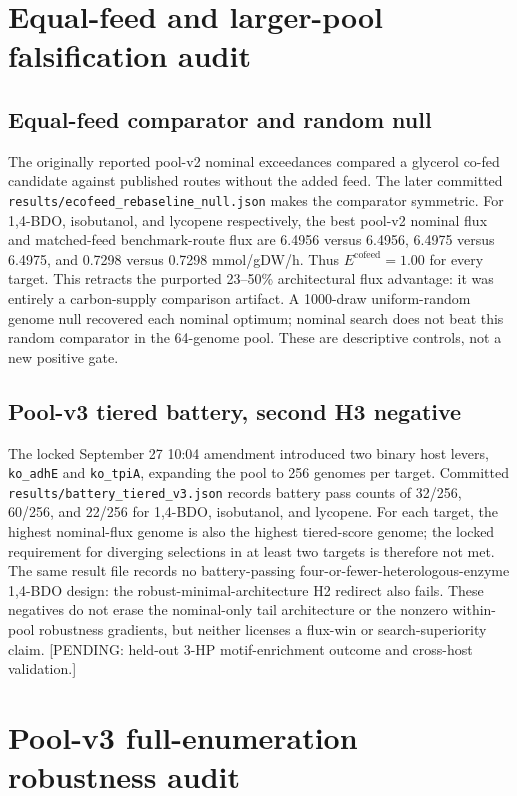 \section{Equal-feed and larger-pool falsification audit}
\subsection{Equal-feed comparator and random null}
The originally reported pool-v2 nominal exceedances compared a glycerol co-fed candidate against published routes without the added feed. The later committed \texttt{results/ecofeed\_rebaseline\_null.json} makes the comparator symmetric. For 1,4-BDO, isobutanol, and lycopene respectively, the best pool-v2 nominal flux and matched-feed benchmark-route flux are 6.4956 versus 6.4956, 6.4975 versus 6.4975, and 0.7298 versus 0.7298 mmol/gDW/h. Thus $E^{\mathrm{cofeed}}=1.00$ for every target. This retracts the purported 23--50\% architectural flux advantage: it was entirely a carbon-supply comparison artifact. A 1000-draw uniform-random genome null recovered each nominal optimum; nominal search does not beat this random comparator in the 64-genome pool. These are descriptive controls, not a new positive gate.
\subsection{Pool-v3 tiered battery, second H3 negative}
The locked September 27 10:04 amendment introduced two binary host levers, \texttt{ko\_adhE} and \texttt{ko\_tpiA}, expanding the pool to 256 genomes per target. Committed \texttt{results/battery\_tiered\_v3.json} records battery pass counts of 32/256, 60/256, and 22/256 for 1,4-BDO, isobutanol, and lycopene. For each target, the highest nominal-flux genome is also the highest tiered-score genome; the locked requirement for diverging selections in at least two targets is therefore not met. The same result file records no battery-passing four-or-fewer-heterologous-enzyme 1,4-BDO design: the robust-minimal-architecture H2 redirect also fails. These negatives do not erase the nominal-only tail architecture or the nonzero within-pool robustness gradients, but neither licenses a flux-win or search-superiority claim. [PENDING: held-out 3-HP motif-enrichment outcome and cross-host validation.]

\section{Pool-v3 full-enumeration robustness audit}
